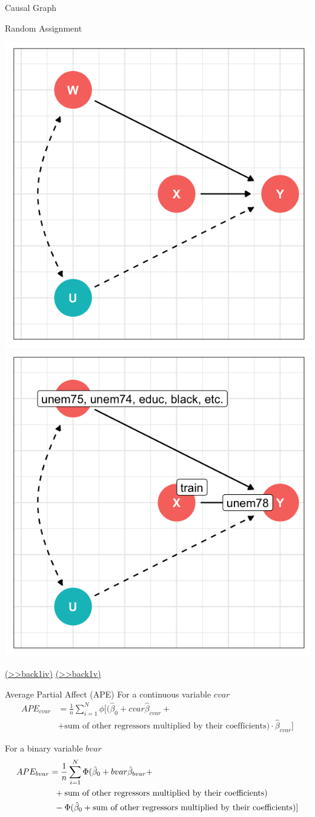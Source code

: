 \documentclass[
  10pt,
  ignorenonframetext,
]{beamer}
\begin{document}
\begin{frame}{Causal Graph}
\protect\hypertarget{RA}{}
\begin{block}{Random Assignment}
\protect\hypertarget{random-assignment}{}
\begin{center}\includegraphics[width=0.4\linewidth,height=0.54\textheight]{pictures/RCTCsetting1} \includegraphics[width=0.4\linewidth,height=0.54\textheight]{pictures/RCTCsetting2} \end{center}

\footnotesize\protect\hyperlink{Ex1-iv}{(\textgreater\textgreater back1iv)}
\normalsize \footnotesize\protect\hyperlink{Ex1-v}{(\textgreater\textgreater back1v)}
\normalsize
\end{block}
\end{frame}

\begin{frame}{Average Partial Affect (APE)}
\protect\hypertarget{APEcalculation}{}
For a continuous variable \(cvar\) \[
\begin{aligned}
APE_{cvar} &= \frac{1}{n} \sum_{i=1}^{N} \phi [(\hat{\beta}_0 + cvar \hat\beta_{cvar} + \\
&+  \text{sum of other regressors multiplied by their coefficients})\cdot \hat\beta_{cvar} ]
\end{aligned}
\]

For a binary variable \(bvar\) \[
\begin{aligned}
APE_{bvar} &= \frac{1}{n} \sum_{i=1}^{N} \Phi (\hat{\beta}_0 + bvar \hat\beta_{bvar} + \\
&\hspace{2mm}+  \text{sum of other regressors multiplied by their coefficients}) \\
&\hspace{2mm}- \Phi (\hat{\beta}_0 +  \text{sum of other regressors multiplied by their coefficients} ) ]
\end{aligned}
\]
\end{frame}
\end{document}
